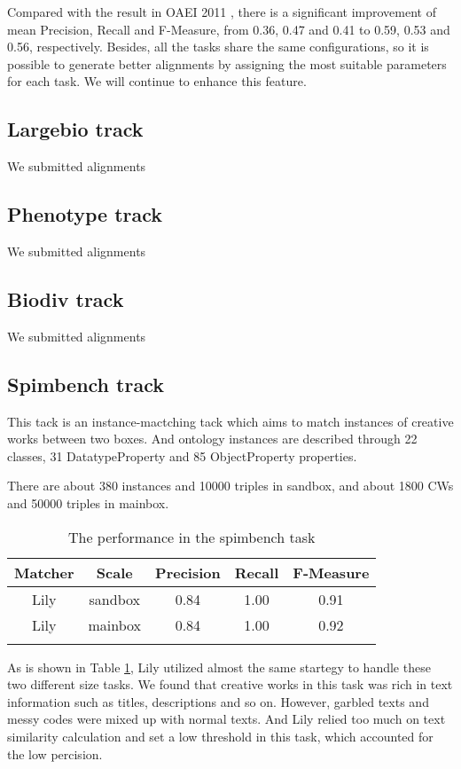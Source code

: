 \documentclass{llncs}
\begin{document}
Compared with the result in OAEI 2011 \cite{lily_oaei2011}, there is a significant improvement of mean Precision, Recall and F-Measure, from 0.36, 0.47 and 0.41 to 0.59, 0.53 and 0.56, respectively. Besides, all the tasks share the same configurations, so it is possible to generate better alignments by assigning the most suitable parameters for each task. We will continue to enhance this feature. \par

\subsection{Largebio track}
We submitted alignments  \par

\subsection{Phenotype track}
We submitted alignments  \par

\subsection{Biodiv track}
We submitted alignments  \par

\subsection{Spimbench track}
This tack is an instance-mactching tack which aims to match instances of creative works between two boxes. And ontology instances are described through 22 classes, 31 DatatypeProperty and 85 ObjectProperty properties. \par
There are about 380 instances and 10000 triples in sandbox, and about 1800 CWs and 50000 triples in mainbox.\par
\begin{table}[H]
\caption{The performance in the spimbench task} \label{tab:perf_im_author_dis}
\centering
\begin{tabular}{c|c|c|c|c}
\Xhline{1.5pt}
Matcher & Scale & Precision & Recall & F-Measure \\ \hline
\Xhline{0.5pt}
Lily & sandbox & 0.84 & 1.00 & 0.91 \\ \hline
Lily & mainbox & 0.84 & 1.00 & 0.92 \\
\Xhline{1.5pt}
\end{tabular}
\end{table}
As is shown in Table \ref{tab:perf_im_author_dis}, Lily utilized almost the same startegy to handle these two different size tasks. We found that creative works in this task was rich in text information such as titles, descriptions and so on. However, garbled texts and messy codes were mixed up with normal texts. And Lily relied too much on text similarity calculation  and set a low threshold in this task, which accounted for the low percision.\par
\end{document}
